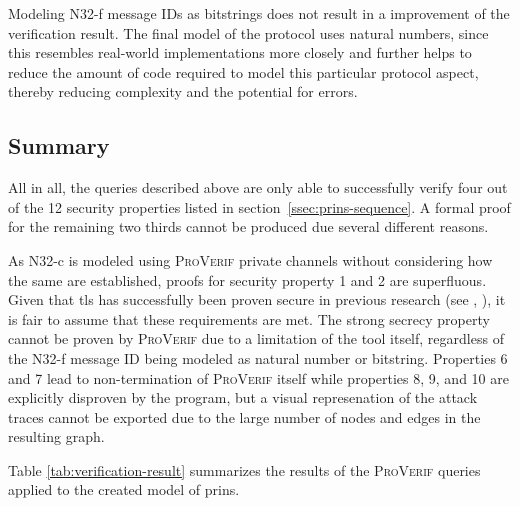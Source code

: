 Modeling N32-f message IDs as bitstrings does not result in a improvement of the verification result.
The final model of the protocol uses natural numbers, since this resembles real-world implementations more closely and further helps to reduce the amount of code required to model this particular protocol aspect, thereby reducing complexity and the potential for errors.

\subsection{Summary}
\label{ssec:verif-summary}

All in all, the queries described above are only able to successfully verify four out of the 12 security properties listed in section~\ref{ssec:prins-sequence}.
A formal proof for the remaining two thirds cannot be produced due several different reasons.

As N32-c is modeled using \textsc{ProVerif} private channels without considering how the same are established, proofs for security property 1 and 2 are superfluous.
Given that \gls{tls} has successfully been proven secure in previous research (see \cite{cremers2017comprehensive}, \cite{van2018analysis}), it is fair to assume that these requirements are met.
The strong secrecy property cannot be proven by \textsc{ProVerif} due to a limitation of the tool itself, regardless of the N32-f message ID being modeled as natural number or bitstring.
Properties 6 and 7 lead to non-termination of \textsc{ProVerif} itself while properties 8, 9, and 10 are explicitly disproven by the program, but a visual represenation of the attack traces cannot be exported due to the large number of nodes and edges in the resulting graph.

Table \ref{tab:verification-result} summarizes the results of the \textsc{ProVerif} queries applied to the created model of \gls{prins}.

